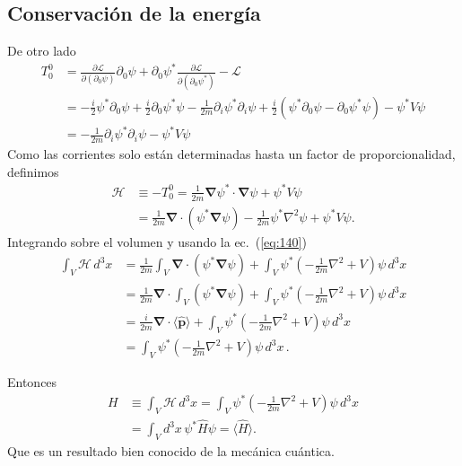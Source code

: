 \begin{subappendices}
\subsection{Conservación de la energía}
De otro lado
\begin{align}
  T^0_0&=\frac{\partial\mathcal{L}}{\partial(\partial_0\psi)}{\partial_0\psi}+{\partial_0\psi^*}\frac{\partial\mathcal{L}}{\partial(\partial_0\psi^*)}-\mathcal{L}\nonumber\\
  &=-\frac{i}{2}\psi^*\partial_0\psi+\frac{i}{2}\partial_0\psi^*\psi-\frac{1}{2m}\partial_i\psi^*\partial_i\psi+\frac{i}{2}
  \left(\psi^*\partial_0\psi-\partial_0\psi^*\psi\right)-\psi^*V\psi\nonumber\\
  &=-\frac{1}{2m}\partial_i\psi^*\partial_i\psi-\psi^*V\psi
\end{align}
Como las corrientes solo est\'an determinadas hasta un factor de proporcionalidad, definimos
\begin{align}
  \label{eq:139}
   \mathcal{H}&\equiv-T^0_0=\frac{1}{2m}\boldsymbol{\nabla}\psi^*\cdot\boldsymbol{\nabla}\psi+\psi^*V\psi\nonumber\\
   &=\frac{1}{2m}\boldsymbol{\nabla}\cdot(\psi^*\boldsymbol{\nabla}\psi)-\frac{1}{2m}\psi^*\nabla^2\psi+\psi^*V\psi.
\end{align}
Integrando sobre el volumen y usando la ec.~(\ref{eq:140})
\begin{align}
 \int_V\mathcal{H}\,d^3x&=\frac{1}{2m}\int_V\boldsymbol{\nabla}\cdot(\psi^*\boldsymbol{\nabla}\psi)
+\int_V\psi^*\left(-\frac{1}{2m}\nabla^2+V\right)\psi\,d^3x\nonumber\\
&=\frac{1}{2m}\boldsymbol{\nabla}\cdot\int_V(\psi^*\boldsymbol{\nabla}\psi)
+\int_V\psi^*\left(-\frac{1}{2m}\nabla^2+V\right)\psi\,d^3x\nonumber\\
&=\frac{i}{2m}\boldsymbol{\nabla}\cdot\langle\widehat{\mathbf{p}}\rangle
+\int_V\psi^*\left(-\frac{1}{2m}\nabla^2+V\right)\psi\,d^3x\nonumber\\
&=\int_V\psi^*\left(-\frac{1}{2m}\nabla^2+V\right)\psi\,d^3x\,.
\end{align}

Entonces
\begin{align}
\label{eq:141}
H&\equiv \int_V\mathcal{H}\,d^3x=\int_V\psi^*\left(-\frac{1}{2m}\nabla^2+V\right)\psi\,d^3x\nonumber\\
&=\int_{V} d^3x\,\psi^*\widehat{H}\psi=\langle\widehat{H}\rangle.
\end{align}
Que es un resultado bien conocido de la mec\'anica cu\'antica.


\end{subappendices}
